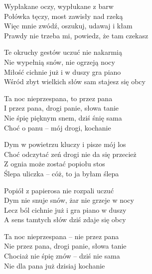\begin{text}
Wypłakane oczy, wypłukane z barw\\
Połówka tęczy, most zawisły nad rzeką\\
Więc mnie zwódź, oszukuj, udawaj i kłam\\
Prawdy nie trzeba mi, powiedz, że tam czekasz

Te okruchy gestów uczuć nie nakarmią\\
Nie wypełnią snów, nie ogrzeją nocy\\
Miłość cichnie już i w duszy gra piano\\
Wśród zbyt wielkich słów sam stajesz się obcy

Ta noc nieprzespana, to przez pana\\
I przez pana, drogi panie, słowa tanie\\
Nie śpię pięknym snem, dziś śnię sama\\
Choć o panu – mój drogi, kochanie

Dym w powietrzu kluczy i pisze mój los\\
Choć odczytać zeń drogi nie da się przecież\\
Z ognia może zostać popiołu stos\\
Ślepa uliczka – cóż, to ja byłam ślepa

Popiół z papierosa nie rozpali uczuć\\
Dym nie snuje snów, żar nie grzeje w nocy\\
Lecz ból cichnie już i gra piano w duszy\\
A sens tamtych słów dziś zdaje się obcy

Ta noc nieprzespana – nie przez pana\\
Nie przez pana, drogi panie, słowa tanie\\
Chociaż nie śpię znów – dziś nie sama\\
Nie dla pana już dzisiaj kochanie
\end{text}
\begin{chord}
\end{chord}